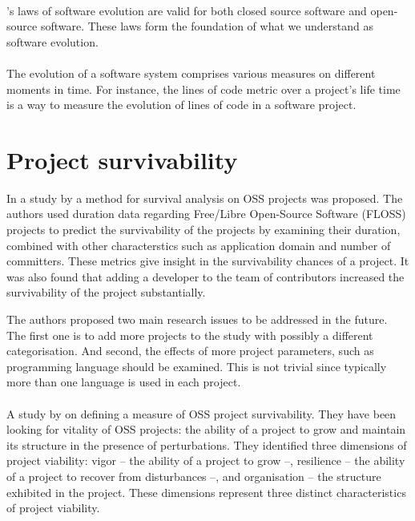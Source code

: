 \paragraph{}
\citeauthor{lehman}'s laws of software evolution are valid for both closed
source software and open-source software. These laws form the foundation of
what we understand as software evolution.

\paragraph{}
The evolution of a software system comprises various measures on different
moments in time. For instance, the lines of code metric over a project's life
time is a way to measure the evolution of lines of code in a software project.



\section{Project survivability}
In a study by \citet{samoladas2010} a method for survival analysis on OSS
projects was proposed. The authors used duration data regarding Free/Libre
Open-Source Software (FLOSS) projects to predict the survivability of the
projects by examining their duration, combined with other characterstics such
as application domain and number of committers. These metrics give insight in
the survivability chances of a project. It was also found that adding a
developer to the team of contributors increased the survivability of the
project substantially.

The authors proposed two main research issues to be addressed in the future.
The first one is to add more projects to the study with possibly a different
categorisation. And second, the effects of more project parameters, such as
programming language should be examined. This is not trivial since typically
more than one language is used in each project.

\paragraph{}
A study by \citet{raja2012} on defining a measure of OSS project survivability.
They have been looking for vitality of OSS projects: the ability of a project
to grow and maintain its structure in the presence of perturbations. They
identified three dimensions of project viability: vigor -- the ability of a
project to grow --, resilience -- the ability of a project to recover from
disturbances --, and organisation -- the structure exhibited in the project.
These dimensions represent three distinct characteristics of project viability.

